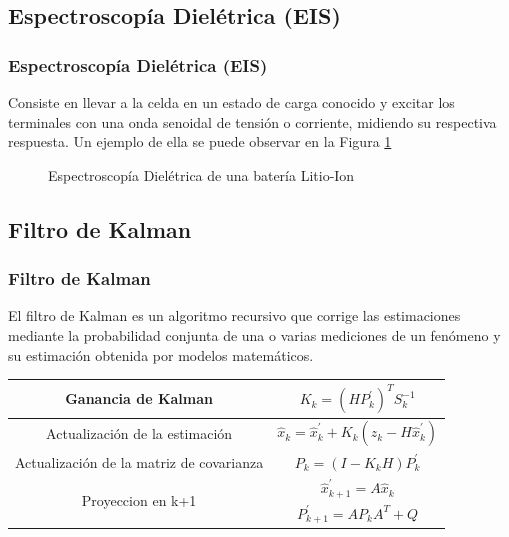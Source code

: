 \documentclass[10pt]{beamer}
\theoremstyle{remark}
\theoremstyle{definition}
\begin{document}
\subsection{Espectroscopía Dielétrica (EIS)}

\begin{frame}[allowframebreaks]
  \frametitle{Espectroscopía Dielétrica (EIS)}
  Consiste en llevar a la celda en un estado de carga conocido y excitar los
  terminales con una onda senoidal de tensión o corriente, midiendo su respectiva
  respuesta. Un ejemplo de ella se puede observar en la Figura \ref{fig:nyq_eis}

  \begin{figure}[h!]
	\centering
	\caption{Espectroscopía Dielétrica de una batería Litio-Ion}
	\label{fig:nyq_eis}
  \end{figure}
\end{frame}

\subsection{Filtro de Kalman}

\begin{frame}[allowframebreaks]
  \frametitle{Filtro de Kalman}

  El filtro de Kalman es un algoritmo recursivo que corrige las estimaciones
  mediante la probabilidad conjunta de una o varias mediciones de un fenómeno y
  su estimación obtenida por modelos matemáticos.

  \begin{table}[h!]
	\centering
	\begin{tabular}{|c|c|}
	  \hline
	  \rule{0pt}{4ex}	Ganancia de Kalman 							& $K_k = (H P^\prime_k)^T S_k^{-1}$  \\ \hline
	  \rule{0pt}{4ex}	Actualización de la estimación			    &  $\hat{x}_k = \hat{x}^\prime_k + K_k (z_k - H\hat{x}^\prime_k)$\\ \hline
	  \rule{0pt}{4ex}	Actualización de la matriz de covarianza    & $P_k = (I - K_k H) P^\prime_k$ \\ \hline
	  \multirow{2}{*}{Proyeccion en k+1}        		  			& \rule{0pt}{4ex} $\hat{x}^\prime_{k+1} = A \hat{x}_k$ \\ \cline{2-2}
	  & \rule{0pt}{4ex} $P^\prime_{k+1} = A P_k A^{T} + Q$ \\ \hline
	\end{tabular}
	\label{Ecuaciones_Kalman}
  \end{table}
\end{frame}
\end{document}
